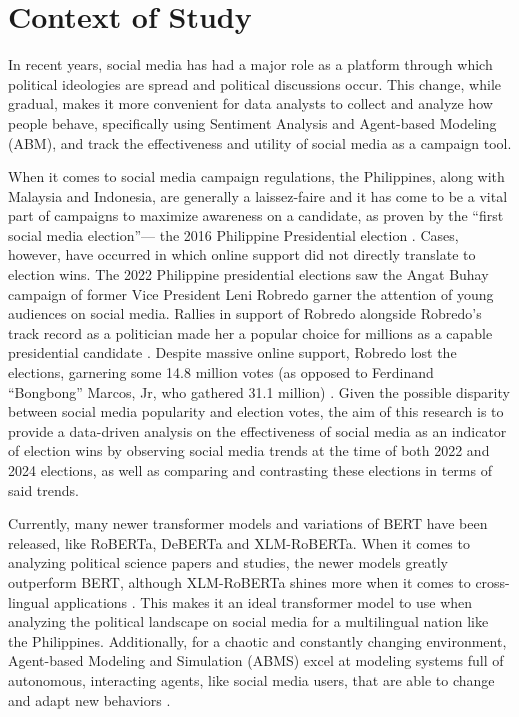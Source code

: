 \section{Context of Study}
In recent years, social media has had a major role as a platform through which political ideologies are spread and political discussions occur. This change, while gradual, makes it more convenient for data analysts to collect and analyze how people behave, specifically using Sentiment Analysis and Agent-based Modeling (ABM), and track the effectiveness and utility of social media as a campaign tool. 

When it comes to social media campaign regulations, the Philippines, along with Malaysia and Indonesia, are generally a laissez-faire and it has come to be a vital part of campaigns to maximize awareness on a candidate, as proven by the “first social media election”— the 2016 Philippine Presidential election \cite{Tapsell-2020, Sinpeng-2020}. Cases, however, have occurred in which online support did not directly translate to election wins. The 2022 Philippine presidential elections saw the Angat Buhay campaign of former Vice President Leni Robredo garner the attention of young audiences on social media. Rallies in support of Robredo alongside Robredo’s track record as a politician made her a popular choice for millions as a capable presidential candidate \cite{Johnson-2022}. Despite massive online support, Robredo lost the elections, garnering some 14.8 million votes (as opposed to Ferdinand “Bongbong” Marcos, Jr, who gathered 31.1 million) \cite{ABSCBN-2022}. Given the possible disparity between social media popularity and election votes, the aim of this research is to provide a data-driven analysis on the effectiveness of social media as an indicator of election wins by observing social media trends at the time of both 2022 and 2024 elections, as well as comparing and contrasting these elections in terms of said trends.

Currently, many newer transformer models and variations of BERT have been released, like RoBERTa, DeBERTa and XLM-RoBERTa. When it comes to analyzing political science papers and studies, the newer models greatly outperform BERT, although XLM-RoBERTa shines more when it comes to cross-lingual applications \cite{Timoneda-2025}. This makes it an ideal transformer model to use when analyzing the political landscape on social media for a multilingual nation like the Philippines. Additionally, for a chaotic and constantly changing environment, Agent-based Modeling and Simulation (ABMS) excel at modeling systems full of autonomous, interacting agents, like social media users, that are able to change and adapt new behaviors \cite{Macal-2009}.

